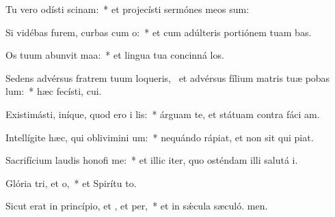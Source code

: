 \item Tu vero odísti scinam:~* et projecísti sermónes meos sum:
\item Si vidébas furem, curbas cum o:~* et cum adúlteris portiónem tuam bas.
\item Os tuum abunvit maa:~* et lingua tua concinná los.
\item Sedens advérsus fratrem tuum loqueris,~\pscross{} et advérsus fílium matris tuæ pobas lum:~* hæc fecísti,  cui.
\item Existimásti, iníque, quod ero i lis:~* árguam te, et státuam contra fáci am.
\item Intellígite hæc, qui oblivimini um:~* nequándo rápiat, et non sit qui piat.
\item Sacrifícium laudis honofi me:~* et illic iter, quo osténdam illi salutá i.
\item Glória tri, et o,~* et Spirítu to.
\item Sicut erat in princípio, et , et per,~* et in sǽcula sæculó. men.

